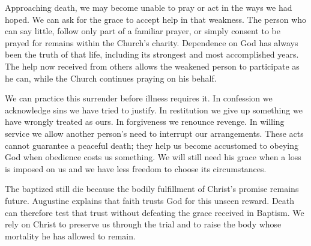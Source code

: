 Approaching death, we may become unable to pray or act in the ways we had hoped. We can ask for the grace to accept help in that weakness. The person who can say little, follow only part of a familiar prayer, or simply consent to be prayed for remains within the Church's charity. Dependence on God has always been the truth of that life, including its strongest and most accomplished years. The help now received from others allows the weakened person to participate as he can, while the Church continues praying on his behalf.

We can practice this surrender before illness requires it. In confession we acknowledge sins we have tried to justify. In restitution we give up something we have wrongly treated as ours. In forgiveness we renounce revenge. In willing service we allow another person's need to interrupt our arrangements. These acts cannot guarantee a peaceful death; they help us become accustomed to obeying God when obedience costs us something. We will still need his grace when a loss is imposed on us and we have less freedom to choose its circumstances.

The baptized still die because the bodily fulfillment of Christ's promise remains future. Augustine explains that faith trusts God for this unseen reward. Death can therefore test that trust without defeating the grace received in Baptism. We rely on Christ to preserve us through the trial and to raise the body whose mortality he has allowed to remain.


